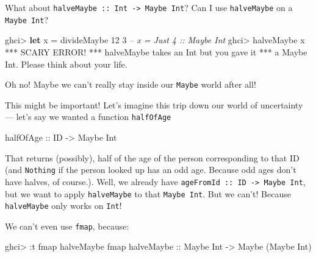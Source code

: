 \documentclass[]{article}
\newenvironment{Shaded}{}{}
\newcommand{\KeywordTok}[1]{\textcolor[rgb]{0.00,0.44,0.13}{\textbf{{#1}}}}
\newcommand{\DataTypeTok}[1]{\textcolor[rgb]{0.56,0.13,0.00}{{#1}}}
\newcommand{\DecValTok}[1]{\textcolor[rgb]{0.25,0.63,0.44}{{#1}}}
\newcommand{\CommentTok}[1]{\textcolor[rgb]{0.38,0.63,0.69}{\textit{{#1}}}}
\newcommand{\OtherTok}[1]{\textcolor[rgb]{0.00,0.44,0.13}{{#1}}}
\newcommand{\FunctionTok}[1]{\textcolor[rgb]{0.02,0.16,0.49}{{#1}}}
\newcommand{\NormalTok}[1]{{#1}}
\begin{document}
What about \texttt{halveMaybe\ ::\ Int\ -\textgreater{}\ Maybe\ Int}? Can I use \texttt{halveMaybe}
on a \texttt{Maybe\ Int}?

\begin{Shaded}
\begin{Highlighting}[]
\NormalTok{ghci}\FunctionTok{>} \KeywordTok{let} \NormalTok{x }\FunctionTok{=} \NormalTok{divideMaybe }\DecValTok{12} \DecValTok{3}     \CommentTok{-- x = Just 4 :: Maybe Int}
\NormalTok{ghci}\FunctionTok{>} \NormalTok{halveMaybe x}
\FunctionTok{***} \DataTypeTok{SCARY} \DataTypeTok{ERROR}\FunctionTok{!}
\FunctionTok{***} \NormalTok{halveMaybe takes an }\DataTypeTok{Int} \NormalTok{but you gave it}
\FunctionTok{***} \NormalTok{a }\DataTypeTok{Maybe} \DataTypeTok{Int}\FunctionTok{.}  \DataTypeTok{Please} \NormalTok{think about your life}\FunctionTok{.}
\end{Highlighting}
\end{Shaded}

Oh no! Maybe we can't really stay inside our \texttt{Maybe} world after all!

This might be important! Let's imagine this trip down our world of uncertainty --- let's say we
wanted a function \texttt{halfOfAge}

\begin{Shaded}
\begin{Highlighting}[]
\OtherTok{halfOfAge ::} \DataTypeTok{ID} \OtherTok{->} \DataTypeTok{Maybe} \DataTypeTok{Int}
\end{Highlighting}
\end{Shaded}

That returns (possibly), half of the age of the person corresponding to that ID (and
\texttt{Nothing} if the person looked up has an odd age. Because odd ages don't have halves, of
course.). Well, we already have \texttt{ageFromId\ ::\ ID\ -\textgreater{}\ Maybe\ Int}, but we want
to apply \texttt{halveMaybe} to that \texttt{Maybe\ Int}. But we can't! Because \texttt{halveMaybe}
only works on \texttt{Int}!

We can't even use \texttt{fmap}, because:

\begin{Shaded}
\begin{Highlighting}[]
\NormalTok{ghci}\FunctionTok{>} \FunctionTok{:}\NormalTok{t fmap halveMaybe}
\NormalTok{fmap}\OtherTok{ halveMaybe ::} \DataTypeTok{Maybe} \DataTypeTok{Int} \OtherTok{->} \DataTypeTok{Maybe} \NormalTok{(}\DataTypeTok{Maybe} \DataTypeTok{Int}\NormalTok{)}
\end{Highlighting}
\end{Shaded}
\end{document}
